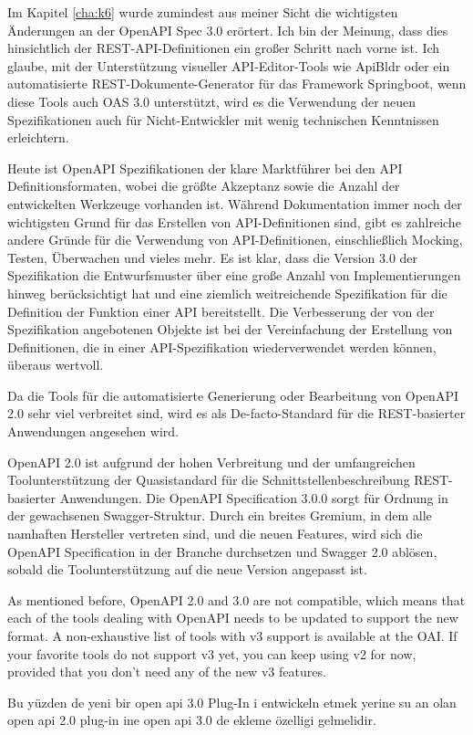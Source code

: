 
Im Kapitel \ref{cha:k6} wurde zumindest aus meiner Sicht die wichtigsten Änderungen an der OpenAPI Spec 3.0 erörtert. Ich bin der Meinung, dass dies hinsichtlich der REST-API-Definitionen ein großer Schritt nach vorne ist. Ich glaube, mit der Unterstützung visueller API-Editor-Tools wie ApiBldr oder ein automatisierte REST-Dokumente-Generator für das Framework Springboot, wenn diese Tools auch OAS 3.0 unterstützt, wird es die Verwendung der neuen Spezifikationen auch für Nicht-Entwickler mit wenig technischen Kenntnissen erleichtern.

Heute ist OpenAPI Spezifikationen der klare Marktführer bei den API Definitionsformaten, wobei die größte Akzeptanz sowie die Anzahl der entwickelten Werkzeuge vorhanden ist. Während Dokumentation immer noch der wichtigsten Grund für das Erstellen von API-Definitionen sind, gibt es zahlreiche andere Gründe für die Verwendung von API-Definitionen, einschließlich Mocking, Testen, Überwachen und vieles mehr. Es ist klar, dass die Version 3.0 der Spezifikation die Entwurfsmuster über eine große Anzahl von Implementierungen hinweg berücksichtigt hat und eine ziemlich weitreichende Spezifikation für die Definition der Funktion einer API bereitstellt. Die Verbesserung der von der Spezifikation angebotenen Objekte ist bei der Vereinfachung der Erstellung von Definitionen, die in einer API-Spezifikation wiederverwendet werden können, überaus wertvoll.

Da die Tools für die automatisierte Generierung oder Bearbeitung von OpenAPI 2.0 sehr viel verbreitet sind, wird es als De-facto-Standard für die REST-basierter Anwendungen angesehen wird. 

OpenAPI 2.0 ist aufgrund der hohen Verbreitung und der umfangreichen Toolunterstützung der Quasistandard für die Schnittstellenbeschreibung REST-basierter Anwendungen. Die OpenAPI Specification 3.0.0 sorgt für Ordnung in der gewachsenen Swagger-Struktur. Durch ein breites Gremium, in dem alle namhaften Hersteller vertreten sind, und die neuen Features, wird sich die OpenAPI Specification in der Branche durchsetzen und Swagger 2.0 ablösen, sobald die Toolunterstützung auf die neue Version angepasst ist.

As mentioned before, OpenAPI 2.0 and 3.0 are not compatible, which means that each of the tools dealing with OpenAPI needs to be updated to support the new format. A non-exhaustive list of tools with v3 support is available at the OAI. If your favorite tools do not support v3 yet, you can keep using v2 for now, provided that you don't need any of the new v3 features.

Bu yüzden de yeni bir open api 3.0 Plug-In i entwickeln etmek yerine su an olan open api 2.0 plug-in ine open api 3.0 de ekleme özelligi gelmelidir.







